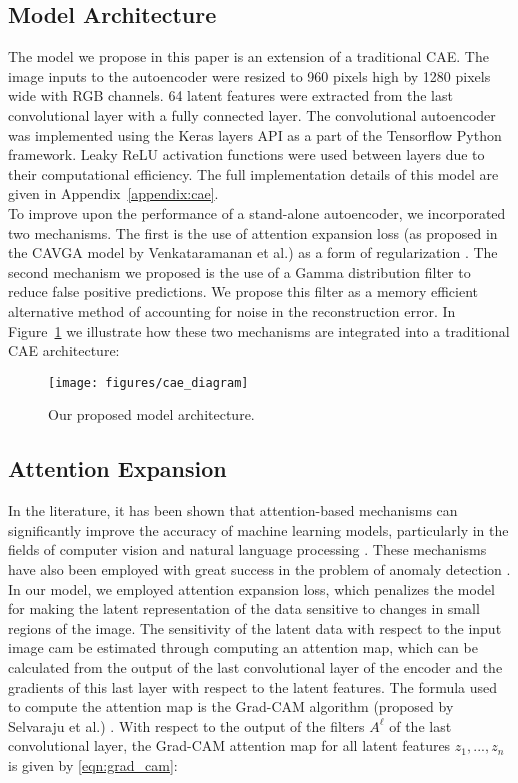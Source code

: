 \documentclass[12pt]{article}
\begin{document}
\subsection{Model Architecture}

The model we propose in this paper is an extension of a traditional CAE. The image inputs to the autoencoder were resized to 960 pixels high by 1280 pixels wide with RGB channels. 64 latent features were extracted from the last convolutional layer with a fully connected layer. The convolutional autoencoder was implemented using the Keras layers API as a part of the Tensorflow Python framework. Leaky ReLU activation functions were used between layers due to their computational efficiency. The full implementation details of this model are given in Appendix~\ref{appendix:cae}.\\

To improve upon the performance of a stand-alone autoencoder, we incorporated two mechanisms. The first is the use of attention expansion loss (as proposed in the CAVGA model by Venkataramanan et al.) as a form of regularization \cite{attention_anomalies}. The second mechanism we proposed is the use of a Gamma distribution filter to reduce false positive predictions. We propose this filter as a memory efficient alternative method of accounting for noise in the reconstruction error. In Figure~\ref{fig:cae_diagram} we illustrate how these two mechanisms are integrated into a traditional CAE architecture:

\begin{figure}[H]
\texttt{[image: figures/cae\_diagram]}
\caption{Our proposed model architecture.}
\label{fig:cae_diagram}
\end{figure}

\subsection{Attention Expansion}

In the literature, it has been shown that attention-based mechanisms can significantly improve the accuracy of machine learning models, particularly in the fields of computer vision and natural language processing \cite{attention_iayn,image_transformers}. These mechanisms have also been employed with great success in the problem of anomaly detection \cite{attention_song, attention_anomalies}. In our model, we employed attention expansion loss, which penalizes the model for making the latent representation of the data sensitive to changes in small regions of the image.  The sensitivity of the latent data with respect to the input image cam be estimated through computing an attention map, which can be calculated from the output of the last convolutional layer of the encoder and the gradients of this last layer with respect to the latent features. The formula used to compute the attention map is the Grad-CAM algorithm (proposed by Selvaraju et al.) \cite{grad_cam}. With respect to the output of the filters $A^\ell$ of the last convolutional layer, the Grad-CAM attention map for all latent features $z_1, ..., z_n$ is given by \eqref{eqn:grad_cam}:
\end{document}
